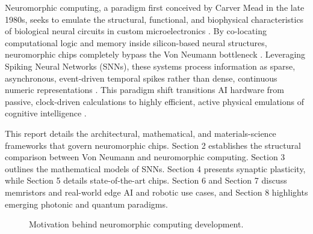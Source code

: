 \documentclass[11pt]{article}
\begin{document}
Neuromorphic computing, a paradigm first conceived by Carver Mead in the late 1980s, seeks to emulate the structural, functional, and biophysical characteristics of biological neural circuits in custom microelectronics \cite{schuman2017survey,mead1990neuromorphic}. By co-locating computational logic and memory inside silicon-based neural structures, neuromorphic chips completely bypass the Von Neumann bottleneck \cite{schuman2017survey,mead1990neuromorphic}. Leveraging Spiking Neural Networks (SNNs), these systems process information as sparse, asynchronous, event-driven temporal spikes rather than dense, continuous numeric representations \cite{schuman2017survey,mead1990neuromorphic}. This paradigm shift transitions AI hardware from passive, clock-driven calculations to highly efficient, active physical emulations of cognitive intelligence \cite{schuman2017survey,mead1990neuromorphic}.

This report details the architectural, mathematical, and materials-science frameworks that govern neuromorphic chips. Section 2 establishes the structural comparison between Von Neumann and neuromorphic computing. Section 3 outlines the mathematical models of SNNs. Section 4 presents synaptic plasticity, while Section 5 details state-of-the-art chips. Section 6 and Section 7 discuss memristors and real-world edge AI and robotic use cases, and Section 8 highlights emerging photonic and quantum paradigms.


\begin{figure}[htbp]
    \centering
    \caption{Motivation behind neuromorphic computing development.}
    \label{fig:research_motivation}
\end{figure}
\end{document}
